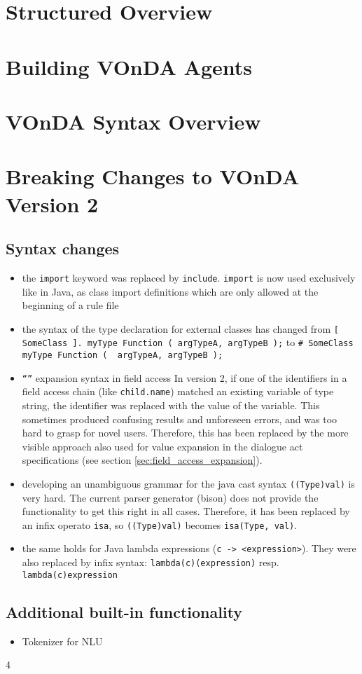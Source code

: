 \documentclass[a4paper]{report}
\newcommand{\vonda}{VOnDA\xspace}
\begin{document}
\chapter{Structured Overview}

\newpage

\newpage

\newpage

\newpage


\chapter{Building \vonda Agents}

\newpage
\chapter{\vonda Syntax Overview}

\chapter{Breaking Changes to \vonda Version 2}
\section*{Syntax changes}
\begin{itemize}
\item the \texttt{import} keyword was replaced by
  \texttt{include}. \texttt{import} is now used exclusively like in
  Java, as class import definitions which are only allowed at the
  beginning of a rule file
\item the syntax of the type declaration for external classes has
  changed from
  \verb|[ SomeClass ]. myType Function ( argTypeA, argTypeB );| to
  \verb|# SomeClass myType Function (  argTypeA, argTypeB );|
\item \texttt{``{}''} expansion syntax in field access In version 2,
  if one of the identifiers in a field access chain (like
  \texttt{child.name}) matched an existing variable of type string,
  the identifier was replaced with the value of the variable. This
  sometimes produced confusing results and unforeseen errors, and was
  too hard to grasp for novel users. Therefore, this has been replaced
  by the more visible approach also used for value expansion in the
  dialogue act specifications (see section
  \ref{sec:field_access_expansion}).
\item developing an unambiguous grammar for the java cast syntax
  \texttt{((Type)val)} is very hard. The current parser generator
  (bison) does not provide the functionality to get this right in all
  cases. Therefore, it has been replaced by an infix operato
  \texttt{isa}, so \texttt{((Type)val)} becomes \texttt{isa(Type,
    val)}.
\item the same holds for Java lambda expressions (\verb|c -> <expression>|). They were also replaced by infix syntax:
  \texttt{lambda(c)(expression)} resp. \texttt{lambda(c){expression}}
\end{itemize}
\section*{Additional built-in functionality}
\begin{itemize}
\item Tokenizer for NLU
\end{itemize}4



\end{document}
